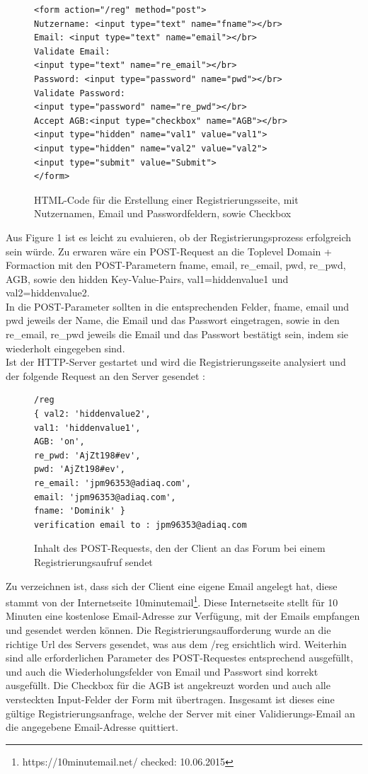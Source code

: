 \begin{figure}[h!]
\begin{lstlisting}[language=HTML5]
<form action="/reg" method="post">
Nutzername: <input type="text" name="fname"></br>
Email: <input type="text" name="email"></br>
Validate Email: 
<input type="text" name="re_email"></br>
Password: <input type="password" name="pwd"></br>
Validate Password: 
<input type="password" name="re_pwd"></br>
Accept AGB:<input type="checkbox" name="AGB"></br>
<input type="hidden" name="val1" value="val1">
<input type="hidden" name="val2" value="val2">
<input type="submit" value="Submit">
</form>
\end{lstlisting}
\caption{HTML-Code für die Erstellung einer Registrierungsseite, mit Nutzernamen, Email und Passwordfeldern, sowie Checkbox}
\end{figure}
\newpage

Aus Figure 1 ist es leicht zu evaluieren, ob der Registrierungsprozess erfolgreich sein würde. Zu erwaren wäre ein POST-Request an die Toplevel Domain + Formaction mit den POST-Parametern fname, email, re\_email, pwd, re\_pwd, AGB, sowie den hidden Key-Value-Pairs, val1=hiddenvalue1 und val2=hiddenvalue2.\\
In die POST-Parameter sollten in die entsprechenden Felder, fname, email und pwd jeweils der Name, die Email und das Passwort eingetragen, sowie in den re\_email, re\_pwd jeweils die Email und das Passwort bestätigt sein, indem sie wiederholt eingegeben sind.\\
Ist der HTTP-Server gestartet und wird die Registrierungsseite analysiert und der folgende Request an den Server gesendet :

\begin{figure}[ht]
\begin{lstlisting}[language=HTML5]
/reg
{ val2: 'hiddenvalue2',
val1: 'hiddenvalue1',
AGB: 'on',
re_pwd: 'AjZt198#ev',
pwd: 'AjZt198#ev',
re_email: 'jpm96353@adiaq.com',
email: 'jpm96353@adiaq.com',
fname: 'Dominik' }
verification email to : jpm96353@adiaq.com
\end{lstlisting}
\caption{Inhalt des POST-Requests, den der Client an das Forum bei einem Registrierungsaufruf sendet}
\end{figure}

Zu verzeichnen ist, dass sich der Client eine eigene Email angelegt hat, diese stammt von der Internetseite 10minutemail\footnote{https://10minutemail.net/ checked: 10.06.2015}.
Diese Internetseite stellt für 10 Minuten eine kostenlose Email-Adresse zur Verfügung, mit der Emails empfangen und gesendet werden können. Die Registrierungsaufforderung wurde an die richtige Url des Servers gesendet, was aus dem /reg ersichtlich wird. Weiterhin sind alle erforderlichen Parameter des POST-Requestes entsprechend ausgefüllt, und auch die Wiederholungsfelder von Email und Passwort sind korrekt ausgefüllt. Die Checkbox für die AGB ist angekreuzt worden und auch alle versteckten Input-Felder der Form mit übertragen. Insgesamt ist dieses eine gültige Registrierungsanfrage, welche der Server mit einer Validierungs-Email an die angegebene Email-Adresse quittiert.

